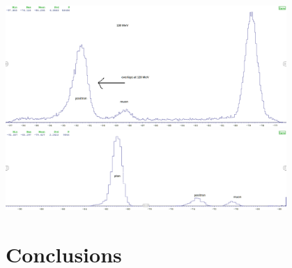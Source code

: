 \begin{refsection}
\includegraphics[width=0.8\textwidth]{Figures/muEDM_Dec2021/TOFAllEnergies130.png}\\
\includegraphics[width=0.8\textwidth]{Figures/muEDM_Dec2021/TOFMediumCut125.png}
\section{Conclusions}

\printbibliography[
    heading = bibliographychapter,
    title=Bibliography on muEDM entrance detector
]

\end{refsection}


